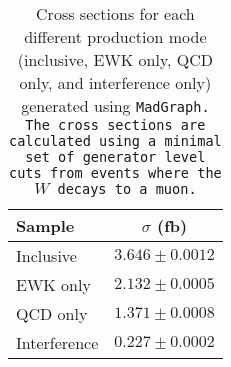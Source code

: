 \begin{table}[htbp]
  \centering
  \begin{tabular}{l | c}
    Sample & $\sigma$ (fb) \\
    \hline\hline
    Inclusive    & $3.646\pm 0.0012$ \\
    EWK only     & $2.132\pm 0.0005$ \\
    QCD only     & $1.371\pm 0.0008$ \\ \hline
    Interference & $0.227\pm 0.0002$ \\
    \hline
  \end{tabular}
  \caption{Cross sections for each different \ssww production mode (inclusive, EWK only, QCD only, and interference only) generated using \tt{MadGraph}.  The cross sections are calculated using a minimal set of generator level cuts from events where the $W$ decays to a muon.}
  \label{tab:ssww13tev_uncert_int_xsec}
\end{table}
